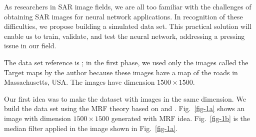 \documentclass[
  journal,
]{IEEEtran}%
\begin{document}
As researchers in SAR image fields, we are all too familiar with the
challenges of obtaining SAR images for neural network applications. In
recognition of these difficulties, we propose building a simulated data
set. This practical solution will enable us to train, validate, and test
the neural network, addressing a pressing issue in our field.

The data set reference is ; in the
first phase, we used only the images called the Target maps by the
author because these images have a map of the roads in Massachusetts,
USA. The images have dimension \(1500 \times 1500\).

Our first idea was to make the dataset with images in the same
dimension. We build the data set using the MRF theory based on
 and
. Fig.~\ref{fig-1a} shows an
image with dimension \(1500 \times 1500\) generated with MRF idea.
Fig.~\ref{fig-1b} is the median filter applied in the image shown in
Fig.~\ref{fig-1a}.
\end{document}
